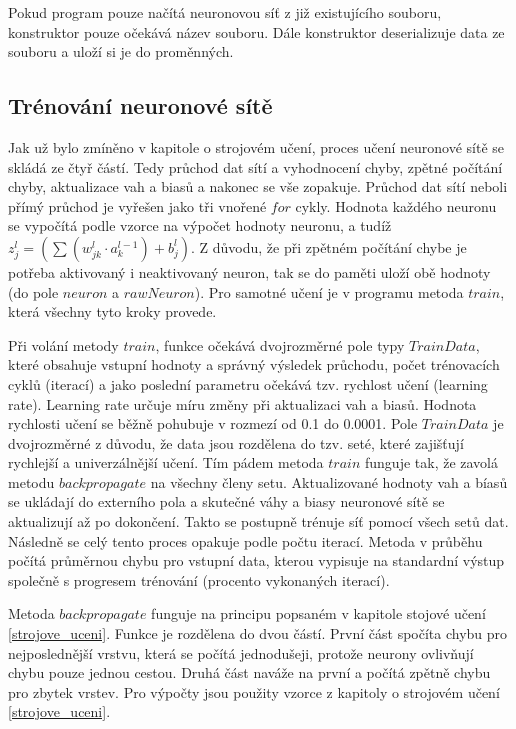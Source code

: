 Pokud program pouze načítá neuronovou síť z již existujícího souboru, konstruktor pouze očekává název souboru.
Dále konstruktor deserializuje data ze souboru a uloží si je do proměnných.

\subsection{Trénování neuronové sítě}
Jak už bylo zmíněno v kapitole o strojovém učení, proces učení neuronové sítě se skládá ze čtyř částí. Tedy průchod dat sítí a vyhodnocení chyby,
zpětné počítání chyby, aktualizace vah a biasů a nakonec se vše zopakuje. Průchod dat sítí neboli přímý průchod je vyřešen jako tři vnořené \(for\) cykly.
Hodnota každého neuronu se vypočítá podle vzorce na výpočet hodnoty neuronu, a tudíž \(z_{j}^{l} = \left( \sum (w^{l}_{jk} \cdot a^{l-1}_k) + b^l_j \right)\).
Z důvodu, že při zpětném počítání chybe je potřeba aktivovaný i neaktivovaný neuron, tak se do paměti uloží obě hodnoty (do pole \(neuron\) a \(rawNeuron\)).
Pro samotné učení je v programu metoda \(train\), která všechny tyto kroky provede.

Při volání metody \(train\), funkce očekává dvojrozměrné pole typy \(TrainData\), které obsahuje vstupní hodnoty a správný výsledek průchodu,
počet trénovacích cyklů (iterací) a jako poslední parametru očekává tzv. rychlost učení (learning rate).
Learning rate určuje míru změny při aktualizaci vah a biasů. Hodnota rychlosti učení se běžně pohubuje v rozmezí od 0.1 do 0.0001.
Pole \(TrainData\) je dvojrozměrné z důvodu, že data jsou rozdělena do tzv. seté, které zajišťují rychlejší a univerzálnější učení.
Tím pádem metoda \(train\) funguje tak, že zavolá metodu \(backpropagate\) na všechny členy setu.
Aktualizované hodnoty vah a bíasů se ukládají do externího pola a skutečné váhy a biasy neuronové sítě se aktualizují až po dokončení.
Takto se postupně trénuje síť pomocí všech setů dat. Následně se celý tento proces opakuje podle počtu iterací.
Metoda v průběhu počítá průměrnou chybu pro vstupní data, kterou vypisuje na standardní výstup společně s progresem trénování (procento vykonaných iterací).

Metoda \(backpropagate\) funguje na principu popsaném v kapitole stojové učení \ref{strojove_uceni}. Funkce je rozdělena do dvou částí.
První část spočíta chybu pro nejposlednější vrstvu, která se počítá jednodušeji, protože neurony ovlivňují chybu pouze jednou cestou.
Druhá část naváže na první a počítá zpětně chybu pro zbytek vrstev. Pro výpočty jsou použity vzorce z kapitoly o strojovém učení \ref{strojove_uceni}.

